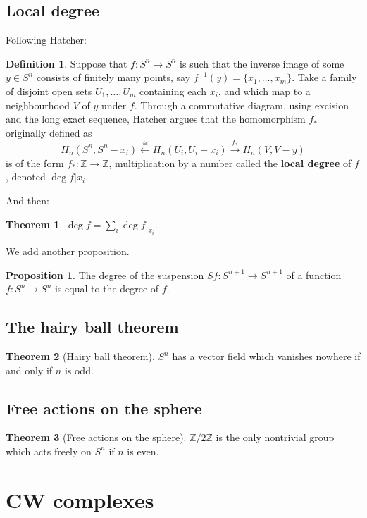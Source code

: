 \documentclass{book}
\theoremstyle{definition}
\newtheorem*{defn}{Definition}
\newtheorem*{teo}{Theorem}
\newtheorem*{prop}{Proposition}
\newcommand{\Z}{\mathbb{Z}}
\begin{document}
\section{Local degree}\label{subsec:grloc}

Following Hatcher:

\begin{defn}
Suppose that $f:S^n\to S^n$ is such that the inverse image of
some $y\in S^n$ consists of finitely many points, say
$f^{-1}(y)=\{x_1,\ldots,x_m\}$. Take a family of disjoint
open sets $U_1,\ldots,U_m$ containing each $x_i$, and which
map to a neighbourhood $V$ of $y$ under $f$. Through a
commutative diagram, using excision and the long exact
sequence, Hatcher argues that the homomorphism $f_*$
originally defined as
$$
H_n(S^n,S^n-x_i)\xleftarrow{\cong}
H_n(U_i,U_i-x_i)\xrightarrow{f_*}H_n(V,V-y)
$$
is of the form $f_*:\Z\to\Z$, multiplication by a number
called the \textbf{local degree} of $f$, denoted
$\deg f|x_i$.
\end{defn}

And then:

\begin{teo}
$\deg f=\sum_i\deg f|_{x_i}$.
\end{teo}

We add another proposition.

\begin{prop}
The degree of the suspension $Sf:S^{n+1}\to S^{n+1}$ of a
function $f:S^n\to S^n$ is equal to the degree of $f$.
\end{prop}

\section{The hairy ball theorem}

\begin{teo}[Hairy ball theorem]
$S^n$ has a vector field which vanishes nowhere if and only
if $n$ is odd.
\end{teo}

\section{Free actions on the sphere}

\begin{teo}[Free actions on the sphere]
$\Z/2\Z$ is the only nontrivial group which acts freely on
$S^n$ if $n$ is even.
\end{teo}

\chapter{CW complexes}\label{chap:CCW}
\end{document}
